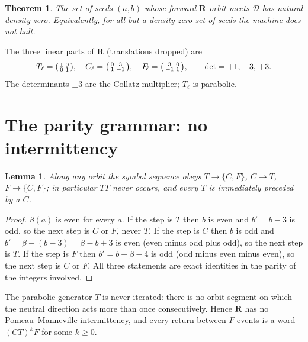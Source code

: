 \documentclass[11pt]{article}
\newtheorem{theorem}{Theorem}\newtheorem{lemma}{Lemma}
\theoremstyle{definition}\newtheorem{definition}{Definition}
\theoremstyle{remark}\newtheorem{remark}{Remark}
\newcommand{\R}{\mathbf{R}}\newcommand{\Z}{\mathbb{Z}}\newcommand{\HH}{\mathbb{H}}
\newcommand{\Flin}{F_{\!\ell}}\newcommand{\Clin}{C_{\ell}}
\begin{document}
\begin{theorem}\label{thm:main}
The set of seeds $(a,b)$ whose forward $\R$-orbit meets $\mathcal D$ has
natural density zero. Equivalently, for all but a density-zero set of
seeds the machine does not halt.
\end{theorem}

The three linear parts of $\R$ (translations dropped) are
\[
T_\ell=\begin{psmallmatrix}1&0\\0&1\end{psmallmatrix},\quad
\Clin=\begin{psmallmatrix}0&3\\1&-1\end{psmallmatrix},\quad
\Flin=\begin{psmallmatrix}3&0\\-1&1\end{psmallmatrix},
\qquad \det=+1,\,-3,\,+3 .
\]
The determinants $\pm3$ are the Collatz multiplier; $T_\ell$ is parabolic.

\section{The parity grammar: no intermittency}
\begin{lemma}\label{lem:grammar}
Along any orbit the symbol sequence obeys $T\!\to\!\{C,F\}$, $C\!\to\!T$,
$F\!\to\!\{C,F\}$; in particular $TT$ never occurs, and every $T$ is
immediately preceded by a $C$.
\end{lemma}
\begin{proof}
$\beta(a)$ is even for every $a$. If the step is $T$ then $b$ is even and
$b'=b-3$ is odd, so the next step is $C$ or $F$, never $T$. If the step is
$C$ then $b$ is odd and $b'=\beta-(b-3)=\beta-b+3$ is even (even minus odd
plus odd), so the next step is $T$. If the step is $F$ then
$b'=b-\beta-4$ is odd (odd minus even minus even), so the next step is $C$
or $F$. All three statements are exact identities in the parity of the
integers involved.
\end{proof}

\begin{corollary}\label{cor:noint}
The parabolic generator $T$ is never iterated: there is no orbit segment
on which the neutral direction acts more than once consecutively. Hence
$\R$ has no Pomeau--Manneville intermittency, and every return between
$F$-events is a word $(CT)^kF$ for some $k\ge0$.
\end{corollary}
\end{document}
